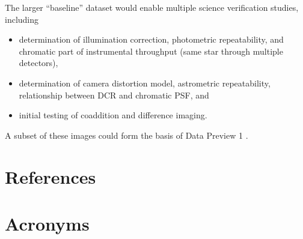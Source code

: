 \documentclass[SE,authoryear,toc]{lsstdoc}
\begin{document}
The larger ``baseline'' dataset would enable multiple science verification studies, including
\begin{itemize}
  \item determination of illumination correction, photometric repeatability, and chromatic part of instrumental throughput (same star through multiple detectors),
  \item determination of camera distortion model, astrometric repeatability, relationship between DCR and chromatic PSF, and
  \item initial testing of coaddition and difference imaging.
\end{itemize}

A subset of these images could form the basis of Data Preview 1 .

\appendix
\section{References} \label{sec:bib}
\renewcommand{\refname}{} %


\section{Acronyms} \label{sec:acronyms}

\end{document}
